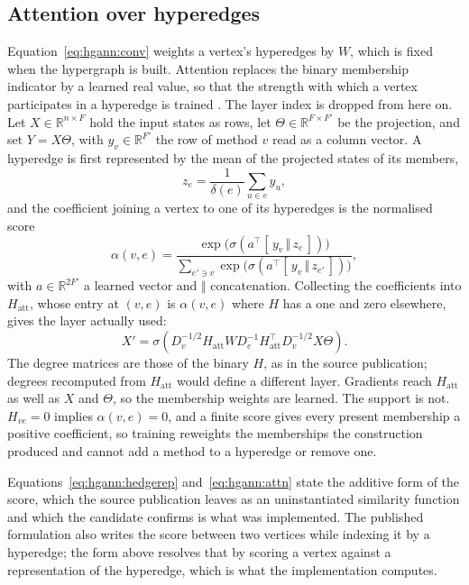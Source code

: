 \subsection*{Attention over hyperedges}

Equation~\ref{eq:hgann:conv} weights a vertex's hyperedges by $W$, which is fixed when the
hypergraph is built. Attention replaces the binary membership indicator by a learned real value,
so that the strength with which a vertex participates in a hyperedge is trained
\cite{bai2021hypergraphattention}. The layer index is dropped from here on. Let
$X \in \mathbb{R}^{n \times F}$ hold the input states as rows, let
$\Theta \in \mathbb{R}^{F \times F'}$ be the projection, and set $Y = X\Theta$, with
$y_v \in \mathbb{R}^{F'}$ the row of method $v$ read as a column vector. A hyperedge is first
represented by the mean of the projected states of its members,
\begin{equation}
  z_e = \frac{1}{\delta(e)} \sum_{u \in e} y_u ,
  \label{eq:hgann:hedgerep}
\end{equation}
and the coefficient joining a vertex to one of its hyperedges is the normalised score
\begin{equation}
  \alpha(v, e) = \frac{\exp\bigl( \sigma( a^{\top} [\, y_v \,\Vert\, z_e \,] ) \bigr)}
                      {\sum_{e' \ni v} \exp\bigl( \sigma( a^{\top} [\, y_v \,\Vert\, z_{e'} \,] ) \bigr)} ,
  \label{eq:hgann:attn}
\end{equation}
with $a \in \mathbb{R}^{2F'}$ a learned vector and $\Vert$ concatenation. Collecting the
coefficients into $H_{\text{att}}$, whose entry at $(v,e)$ is $\alpha(v,e)$ where $H$ has a one and
zero elsewhere, gives the layer actually used:
\begin{equation}
  X' = \sigma\!\left( D_v^{-1/2} H_{\text{att}} W D_e^{-1} H_{\text{att}}^{\top} D_v^{-1/2}
              X \Theta \right) .
  \label{eq:hgann:attnprop}
\end{equation}
The degree matrices are those of the binary $H$, as in the source publication; degrees recomputed
from $H_{\text{att}}$ would define a different layer. Gradients reach $H_{\text{att}}$ as well as
$X$ and $\Theta$, so the membership weights are learned. The support is not. $H_{ve} = 0$ implies
$\alpha(v,e) = 0$, and a finite score gives every present membership a positive coefficient, so
training reweights the memberships the construction produced and cannot add a method to a
hyperedge or remove one.

Equations~\ref{eq:hgann:hedgerep} and~\ref{eq:hgann:attn} state the additive form of the score,
which the source publication leaves as an uninstantiated similarity function and which the
candidate confirms is what was implemented. The published formulation also writes the score
between two vertices while indexing it by a hyperedge; the form above resolves that by scoring a
vertex against a representation of the hyperedge, which is what the implementation computes.

